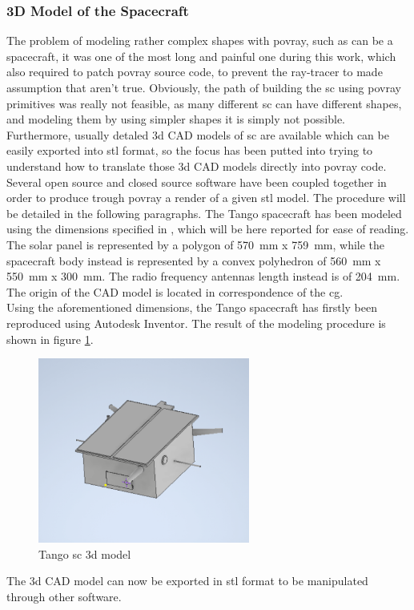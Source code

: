 \subsubsection{3D Model of the Spacecraft}\label{sec:3dmodel}
The problem of modeling rather complex shapes with \acrshort{povray}, such as can be a spacecraft, it was one of the most long and painful one during this work, which also required to patch \acrshort{povray} source code, to prevent the ray-tracer to made assumption that aren't true. Obviously, the path of building the \acrshort{sc} using \acrshort{povray} primitives was really not feasible, as many different \acrshort{sc} can have different shapes, and modeling them by using simpler shapes it is simply not possible. Furthermore, usually detaled \acrshort{3d} CAD models of \acrshort{sc} are available which can be easily exported into \acrshort{stl} format, so the focus has been putted into trying to understand how to translate those \acrshort{3d} CAD models directly into \acrshort{povray} code.
Several open source and closed source software have been coupled together in order to produce trough \acrshort{povray} a render of a given \acrshort{stl} model.
The procedure will be detailed in the following paragraphs.
The Tango spacecraft has been modeled using the dimensions specified in \cite{Sharma2018}, which will be here reported for ease of reading. The solar panel is represented by a polygon of \SI{570}{\mm} x \SI{759}{\mm}, while the spacecraft body instead is represented by a convex polyhedron of \SI{560}{\mm} x \SI{550}{mm} x \SI{300}{\mm}. The radio frequency antennas length instead is of \SI{204}{\mm}. The origin of the CAD model is located in correspondence of the \acrshort{cg}.\\
Using the aforementioned dimensions, the Tango spacecraft has firstly been reproduced using Autodesk Inventor. The result of the modeling procedure is shown in figure \ref{fig:tango3d}.

\begin{figure}[htbp]
  \centering
  \includegraphics[width=0.62\textwidth]{gfx/tangoScreenshot2.eps}
  \caption{Tango \acrshort{sc} \acrshort{3d} model}
  \label{fig:tango3d}
\end{figure}
The \acrshort{3d} CAD model can now be exported in \acrshort{stl} format to be manipulated through other software.

